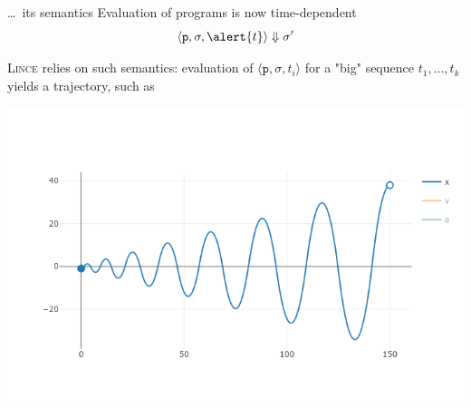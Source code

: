 \documentclass{beamer}
\begin{document}
\begin{frame}{ \dots\ its semantics }
        Evaluation of programs is now \alert{time-dependent}
        \[
                \langle \mathtt{p}, \sigma, \alert{t} \rangle \Downarrow \sigma'
        \]

        \textsc{Lince} relies on such semantics: evaluation of
        $\langle \mathtt{p}, \sigma, t_i \rangle$ for a "big"
        sequence $t_1, \dots, t_k$ yields a trajectory, such as

        \begin{center}
                \includegraphics[scale=.22]{./images/traj.png}
        \end{center}
\end{frame}
\end{document}
